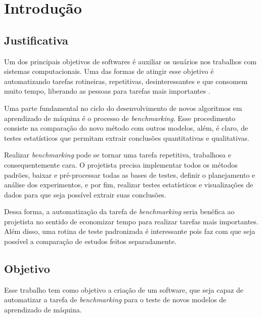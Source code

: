 
\chapter{Introdução}
\label{chap:introducao}

\section{Justificativa}
\label{sec:justificativa}
Um dos principais objetivos de softwares é auxiliar os usuários nos trabalhos com sistemas computacionais. Uma das formas de atingir esse objetivo é automatizando tarefas rotineiras, repetitivas, desinteressantes e que consomem muito tempo, liberando as pessoas para tarefas mais importantes \cite{Zambiasi2012UmaAA}. 

Uma parte fundamental no ciclo do desenvolvimento de novos algoritmos em aprendizado de máquina é o processo de \textit{benchmarking}. Esse procedimento consiste na comparação do novo método com outros modelos, além, é claro, de testes estatísticos que permitam extrair conclusões quantitativas e qualitativas.

Realizar \textit{benchmarking} pode se tornar uma tarefa repetitiva, trabalhosa e consequentemente cara. O projetista precisa implementar todos os métodos padrões, baixar e pré-processar todas as bases de testes, definir o planejamento e análise dos experimentos, e por fim, realizar testes estatísticos e visualizações de dados para que seja possível extrair suas conclusões.

Dessa forma, a automatização da tarefa de \textit{benchmarking} seria benéfica ao projetista no sentido de economizar tempo para realizar tarefas mais importantes. Além disso, uma rotina de teste padronizada é interessante pois faz com que seja possível a comparação de estudos feitos separadamente.


\section{Objetivo}
\label{sec:objetivo}
Esse trabalho tem como objetivo a criação de um software, que seja capaz de automatizar a tarefa de \textit{benchmarking} para o teste de novos modelos de aprendizado de máquina. 

